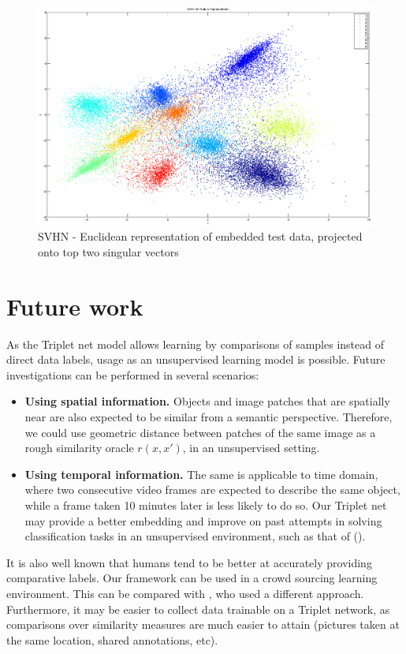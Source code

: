 \documentclass{article} %
\begin{document}
\begin{figure}[h]
\begin{center}
\includegraphics[width=1\linewidth]{svhn-rep.eps}
\end{center}
   \caption{SVHN - Euclidean representation of embedded test data, projected onto top two singular vectors}\label{TripletRepCIFAR10}\label{TripletRepSVHN}
\end{figure}
\section{Future work}
As the Triplet net model allows learning by comparisons of samples instead of direct data labels, usage as an unsupervised learning model is possible.
Future investigations can be performed in several scenarios:
\begin{itemize}
 \item {\bf Using spatial information. }Objects and image patches that are spatially near are also expected to be similar from a semantic perspective. Therefore, we could use geometric distance between patches of the same image as a rough similarity oracle $r(x,x')$, in an unsupervised setting.  
\item {\bf Using temporal information.} The same is applicable to time domain, where two consecutive video frames are expected to describe the same object, while a frame taken 10 minutes later is less likely to do so.
Our Triplet net may provide a better embedding and improve on past attempts in solving classification
tasks in an unsupervised environment, such as that of (\citet{mobahi2009deep}).
\end{itemize}
It is also well known that humans tend to be better at accurately providing comparative labels. Our framework can be used in a crowd sourcing learning environment. This can be compared with \citet{shamir}, who used a different approach.
Furthermore, it may be easier to collect data trainable on a Triplet network, as comparisons over similarity measures are much easier to attain (pictures taken at the same location, shared annotations, etc).
\end{document}
